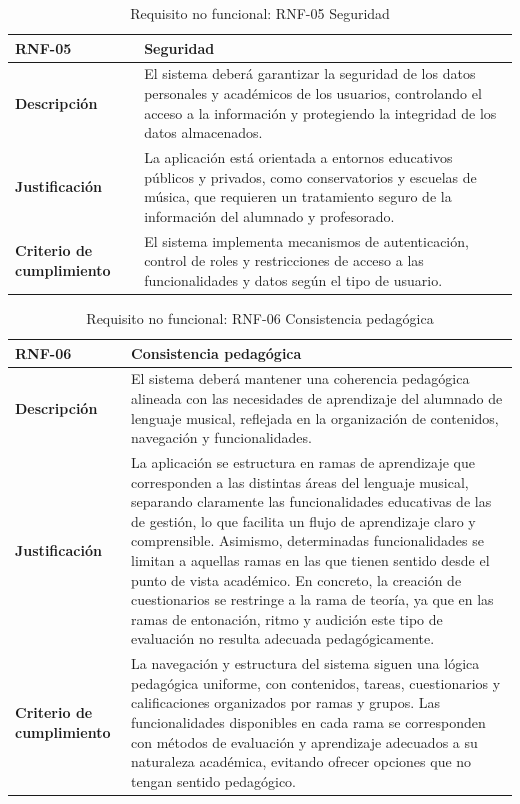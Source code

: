 \begin{table}[H]
\centering
\begin{tabularx}{\textwidth}{
  |>{\centering\arraybackslash}l
  |>{\centering\arraybackslash}X|}
\hline
\textbf{RNF-05} & \textbf{Seguridad} \\ \hline
\textbf{Descripción} & El sistema deberá garantizar la seguridad de los datos personales y académicos de los usuarios, controlando el acceso a la información y protegiendo la integridad de los datos almacenados. \\ \hline
\textbf{Justificación} & La aplicación está orientada a entornos educativos públicos y privados, como conservatorios y escuelas de música, que requieren un tratamiento seguro de la información del alumnado y profesorado. \\ \hline
\textbf{Criterio de cumplimiento} & El sistema implementa mecanismos de autenticación, control de roles y restricciones de acceso a las funcionalidades y datos según el tipo de usuario. \\ \hline
\end{tabularx}
\caption{Requisito no funcional: RNF-05 Seguridad}
\end{table}

\begin{table}[H]
\centering
\begin{tabularx}{\textwidth}{
  |>{\centering\arraybackslash}l
  |>{\centering\arraybackslash}X|}
\hline
\textbf{RNF-06} & \textbf{Consistencia pedagógica} \\ \hline
\textbf{Descripción} & El sistema deberá mantener una coherencia pedagógica alineada con las necesidades de aprendizaje del alumnado de lenguaje musical, reflejada en la organización de contenidos, navegación y funcionalidades. \\ \hline
\textbf{Justificación} & La aplicación se estructura en ramas de aprendizaje que corresponden a las distintas áreas del lenguaje musical, separando claramente las funcionalidades educativas de las de gestión, lo que facilita un flujo de aprendizaje claro y comprensible. Asimismo, determinadas funcionalidades se limitan a aquellas ramas en las que tienen sentido desde el punto de vista académico. En concreto, la creación de cuestionarios se restringe a la rama de teoría, ya que en las ramas de entonación, ritmo y audición este tipo de evaluación no resulta adecuada pedagógicamente.\\ \hline
\textbf{Criterio de cumplimiento} & La navegación y estructura del sistema siguen una lógica pedagógica uniforme, con contenidos, tareas, cuestionarios y calificaciones organizados por ramas y grupos. Las funcionalidades disponibles en cada rama se corresponden con métodos de evaluación y aprendizaje adecuados a su naturaleza académica, evitando ofrecer opciones que no tengan sentido pedagógico.\\ \hline
\end{tabularx}
\caption{Requisito no funcional: RNF-06 Consistencia pedagógica}
\end{table}

